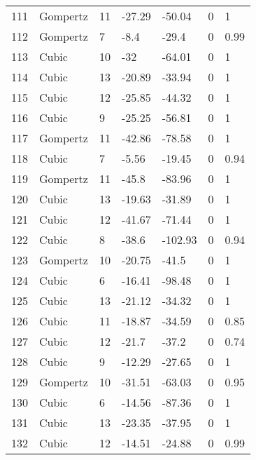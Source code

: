 \documentclass[11pt]{article}
\begin{document}
\begin{center}
\begin{longtable}{lllllll}
        111 & Gompertz  & 11              & -27.29  & -50.04  & 0       & 1    \\
        112 & Gompertz  & 7               & -8.4    & -29.4   & 0       & 0.99 \\
        113 & Cubic     & 10              & -32     & -64.01  & 0       & 1    \\
        114 & Cubic     & 13              & -20.89  & -33.94  & 0       & 1    \\
        115 & Cubic     & 12              & -25.85  & -44.32  & 0       & 1    \\
        116 & Cubic     & 9               & -25.25  & -56.81  & 0       & 1    \\
        117 & Gompertz  & 11              & -42.86  & -78.58  & 0       & 1    \\
        118 & Cubic     & 7               & -5.56   & -19.45  & 0       & 0.94 \\
        119 & Gompertz  & 11              & -45.8   & -83.96  & 0       & 1    \\
        120 & Cubic     & 13              & -19.63  & -31.89  & 0       & 1    \\
        121 & Cubic     & 12              & -41.67  & -71.44  & 0       & 1    \\
        122 & Cubic     & 8               & -38.6   & -102.93 & 0       & 0.94 \\
        123 & Gompertz  & 10              & -20.75  & -41.5   & 0       & 1    \\
        124 & Cubic     & 6               & -16.41  & -98.48  & 0       & 1    \\
        125 & Cubic     & 13              & -21.12  & -34.32  & 0       & 1    \\
        126 & Cubic     & 11              & -18.87  & -34.59  & 0       & 0.85 \\
        127 & Cubic     & 12              & -21.7   & -37.2   & 0       & 0.74 \\
        128 & Cubic     & 9               & -12.29  & -27.65  & 0       & 1    \\
        129 & Gompertz  & 10              & -31.51  & -63.03  & 0       & 0.95 \\
        130 & Cubic     & 6               & -14.56  & -87.36  & 0       & 1    \\
        131 & Cubic     & 13              & -23.35  & -37.95  & 0       & 1    \\
        132 & Cubic     & 12              & -14.51  & -24.88  & 0       & 0.99 \\

\end{longtable}
\end{center}
\end{document}
